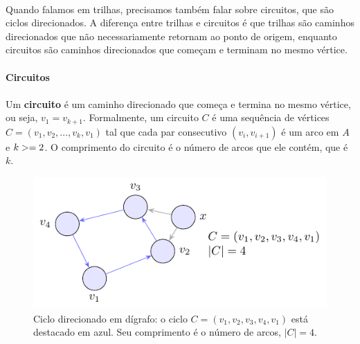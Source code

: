 \documentclass[12pt,a4paper]{article}
\def\geq{\string>=}%
\begin{document}
\paragraph{}
Quando falamos em trilhas, precisamos também falar sobre circuitos, que são ciclos direcionados.
A diferença entre trilhas e circuitos é que trilhas são caminhos direcionados que não necessariamente retornam ao ponto de origem, enquanto circuitos são caminhos direcionados que começam e terminam no mesmo vértice.

\paragraph{Circuitos}
\paragraph{}
 Um \textbf{circuito} é um caminho direcionado que começa e termina no mesmo vértice, ou seja, \(v_1 = v_{k+1}\). Formalmente, um circuito \(C\) é uma sequência de vértices \(C = (v_1, v_2, \ldots, v_k, v_1)\) tal que cada par consecutivo \((v_i, v_{i+1})\) é um arco em \(A\) e \(k \geq 2\). O comprimento do circuito é o número de arcos que ele contém, que é \(k\).


\begin{figure}[H]
    \centering
    \includegraphics[width=0.9\linewidth]{figures/fig_ciclo_direcionado.pdf}

    \caption{Ciclo direcionado em dígrafo: o ciclo $C=(v_1,v_2,v_3,v_4,v_1)$ está destacado em azul. Seu comprimento é o número de arcos, $|C|=4$.}
    \label{fig:ciclo-direcionado}\end{figure}
\end{document}
